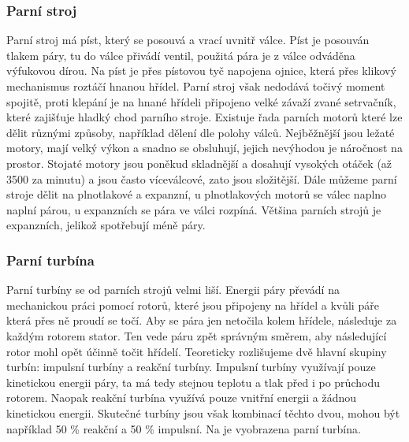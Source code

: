 \subsubsection{Parní stroj}\label{sc:ParniStroj}
{Parní stroj má píst, který se posouvá a vrací uvnitř válce. Píst je posouván tlakem páry, tu do válce přivádí ventil, použitá pára je z válce odváděna výfukovou dírou. Na píst je přes pístovou tyč napojena ojnice, která přes klikový mechanismus roztáčí hnanou hřídel. Parní stroj však nedodává točivý moment spojitě, proti klepání je na hnané hřídeli připojeno velké závaží zvané setrvačník, které zajišťuje hladký chod parního stroje.}
\cite{st:parniStroj}\cite{vutb:parniStroj}\odst
{Existuje řada parních motorů které lze dělit různými způsoby, například dělení dle polohy válců. Nejběžnější jsou ležaté motory, mají velký výkon a snadno se obsluhují, jejich nevýhodou je náročnost na prostor. Stojaté motory jsou poněkud skladnější a dosahují vysokých otáček (až 3500 za minutu) a jsou často víceválcové, zato jsou složitější. Dále můžeme parní stroje dělit na plnotlakové a expanzní, u plnotlakových motorů se válec naplno naplní párou, u expanzních se pára ve válci rozpíná. Většina parních strojů je expanzních, jelikož spotřebují méně páry.}
\cite{st:parniStroj}\cite{vutb:parniStroj}

\newpage

\subsubsection{Parní turbína}\label{sc:ParniTurbina}
{Parní turbíny se od parních strojů velmi liší. Energii páry převádí na mechanickou práci pomocí rotorů, které jsou připojeny na hřídel a kvůli páře která přes ně proudí se točí. Aby se pára jen netočila kolem hřídele, následuje za každým rotorem stator. Ten vede páru zpět správným směrem, aby následující rotor mohl opět účinně točit hřídelí.}
\cite{LESICS:WorkingOfSteamTurbine}\odst
{Teoreticky rozlišujeme dvě hlavní skupiny turbín: impulsní turbíny a reakční turbíny. Impulsní turbíny využívají pouze kinetickou energii páry, ta má tedy stejnou teplotu a tlak před i po průchodu rotorem. Naopak reakční turbína využívá pouze vnitřní energii a žádnou kinetickou energii. Skutečné turbíny jsou však kombinací těchto dvou, mohou být například 50 \% reakční a 50 \% impulsní. Na  je vyobrazena parní turbína.}
\cite{LESICS:WorkingOfSteamTurbine}

